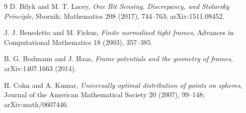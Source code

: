 \documentclass[11pt]{article}
\begin{document}
\begin{thebibliography}{9}
D. Bilyk and M. T. Lacey,
\emph{One Bit Sensing, Discrepancy, and Stolarsky Principle},
Sbornik: Mathematics 208 (2017), 744--763; arXiv:1511.08452.

J. J. Benedetto and M. Fickus,
\emph{Finite normalized tight frames},
Advances in Computational Mathematics 18 (2003), 357--385.

B. G. Bodmann and J. Haas,
\emph{Frame potentials and the geometry of frames},
arXiv:1407.1663 (2014).

H. Cohn and A. Kumar,
\emph{Universally optimal distribution of points on spheres},
Journal of the American Mathematical Society 20 (2007), 99--148;
arXiv:math/0607446.
\end{thebibliography}
\end{document}
